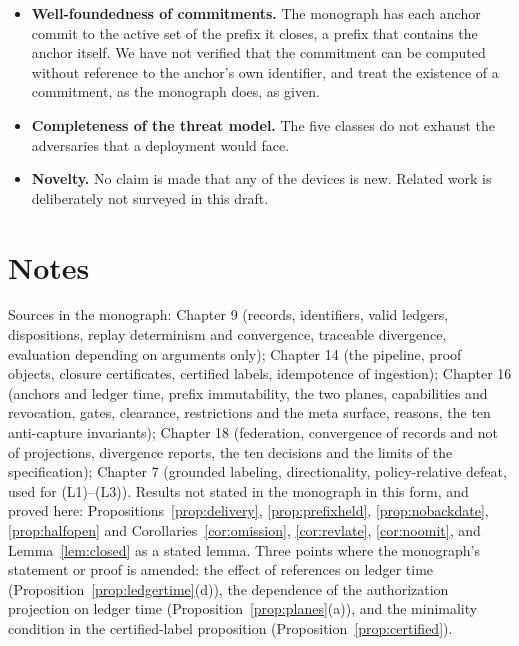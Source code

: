 \documentclass[11pt]{article}
\theoremstyle{plain}
\theoremstyle{definition}
\theoremstyle{remark}
\begin{document}
\begin{itemize}[nosep]
\item \textbf{Well-foundedness of commitments.} The monograph has each anchor commit to the active set of the prefix it closes, a prefix that contains the anchor itself. We have not verified that the commitment can be computed without reference to the anchor's own identifier, and treat the existence of a commitment, as the monograph does, as given.
\item \textbf{Completeness of the threat model.} The five classes do not exhaust the adversaries that a deployment would face.
\item \textbf{Novelty.} No claim is made that any of the devices is new. Related work is deliberately not surveyed in this draft.
\end{itemize}


\section*{Notes}

Sources in the monograph: Chapter 9 (records, identifiers, valid ledgers, dispositions, replay determinism and convergence, traceable divergence, evaluation depending on arguments only); Chapter 14 (the pipeline, proof objects, closure certificates, certified labels, idempotence of ingestion); Chapter 16 (anchors and ledger time, prefix immutability, the two planes, capabilities and revocation, gates, clearance, restrictions and the meta surface, reasons, the ten anti-capture invariants); Chapter 18 (federation, convergence of records and not of projections, divergence reports, the ten decisions and the limits of the specification); Chapter 7 (grounded labeling, directionality, policy-relative defeat, used for (L1)--(L3)). Results not stated in the monograph in this form, and proved here: Propositions~\ref{prop:delivery}, \ref{prop:prefixheld}, \ref{prop:nobackdate}, \ref{prop:halfopen} and Corollaries~\ref{cor:omission}, \ref{cor:revlate}, \ref{cor:noomit}, and Lemma~\ref{lem:closed} as a stated lemma. Three points where the monograph's statement or proof is amended: the effect of references on ledger time (Proposition~\ref{prop:ledgertime}(d)), the dependence of the authorization projection on ledger time (Proposition~\ref{prop:planes}(a)), and the minimality condition in the certified-label proposition (Proposition~\ref{prop:certified}).
\end{document}
